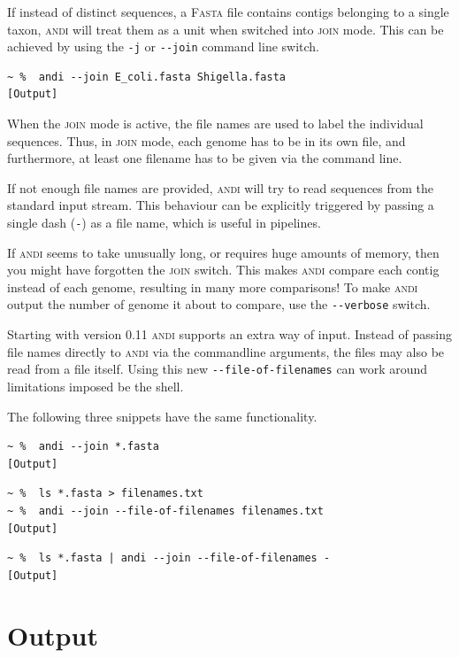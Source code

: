 \documentclass[a4paper,
  10pt,
  english,
  DIV=12,
  BCOR=8mm]{scrbook}
\newcommand{\algo}[1]{\textsc{{#1}}}
\newcommand{\andi}{\algo{andi}\xspace}
\begin{document}
If instead of distinct sequences, a \algo{Fasta} file contains contigs belonging to a single taxon, \andi will treat them as a unit when switched into \algo{join} mode. This can be achieved by using the \lstinline!-j! or \lstinline!--join! command line switch.

\begin{lstlisting}
~ %  andi --join E_coli.fasta Shigella.fasta
[Output]
\end{lstlisting}

When the \algo{join} mode is active, the file names are used to label the individual sequences. Thus, in \algo{join} mode, each genome has to be in its own file, and furthermore, at least one filename has to be given via the command line.

If not enough file names are provided, \andi will try to read sequences from the standard input stream. This behaviour can be explicitly triggered by passing a single dash (\lstinline$-$) as a file name, which is useful in pipelines.

If \andi seems to take unusually long, or requires huge amounts of memory, then you might have forgotten the \algo{join} switch. This makes \andi compare each contig instead of each genome, resulting in many more comparisons! To make \andi output the number of genome it about to compare, use the \lstinline$--verbose$ switch.

Starting with version 0.11 \andi supports an extra way of input. Instead of passing file names directly to \andi via the commandline arguments, the files may also be read from a file itself. Using this new \lstinline$--file-of-filenames$ can work around limitations imposed be the shell.

The following three snippets have the same functionality.

\begin{lstlisting}
~ %  andi --join *.fasta
[Output]
\end{lstlisting}

\begin{lstlisting}
~ %  ls *.fasta > filenames.txt
~ %  andi --join --file-of-filenames filenames.txt
[Output]
\end{lstlisting}

\begin{lstlisting}
~ %  ls *.fasta | andi --join --file-of-filenames -
[Output]
\end{lstlisting}

\section{Output}
\end{document}
